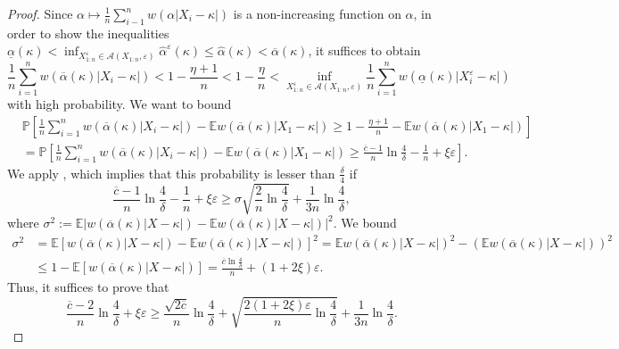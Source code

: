 \documentclass{article}
\theoremstyle{plain}
\theoremstyle{definition}
\def\eps{\varepsilon}
\renewcommand{\Pr}{\mathbb{P}}
\def\sA{\mathcal{A}}
\begin{document}
\begin{appendix}
{\begin{proof}
    Since $\alpha \mapsto \frac{1}{n} \sum_{i-1}^n w(\alpha |X_i - \kappa|)$ is a non-increasing function on $\alpha$, in order to show the inequalities $\underline{\alpha }(\kappa )<\inf_{X_{1:n}^\varepsilon \in \sA(X_{1:n},\varepsilon ) }\widehat{\alpha }^\eps(\kappa ) \le  \widehat{\alpha}(\kappa)< \overline{\alpha}(\kappa ) $, it suffices to obtain
    \[\frac{1}{n}\sum_{i=1}^{n} w(\overline{\alpha}(\kappa)\lvert X_i - \kappa \rvert) < 1-\frac{\eta+1}{n}<1-\frac{\eta}{n}<\inf_{X_{1:n}^\varepsilon \in \sA(X_{1:n},\varepsilon ) } \frac{1}{n}\sum_{i=1}^{n} w(\underline{\alpha}(\kappa)\lvert X_i^\eps - \kappa \rvert)
		\]
		with high probability. We want to bound
		\begin{align*}
			 & \Pr\left[ \frac{1}{n}\sum_{i=1}^{n} w(\overline{\alpha}(\kappa)\lvert X_i - \kappa \rvert) -\mathbb{E}w(\overline{\alpha}(\kappa)\lvert X_1-\kappa \rvert) \ge 1-\frac{\eta+1}{n}-\mathbb{E}w(\overline{\alpha}(\kappa)\lvert X_1-\kappa \rvert)\right] \\
       & =\Pr\left[\frac{1}{n}\sum_{i=1}^{n} w(\overline{\alpha}(\kappa)\lvert X_i - \kappa \rvert) -\mathbb{E}w(\overline{\alpha}(\kappa)\lvert X_1-\kappa \rvert) \ge \frac{\overline{c}-1 }{n}\ln \frac{4}{\delta}-\frac{1}{n}+\xi \eps \right].
		\end{align*}
    We apply , which implies that this probability is lesser than \( \frac{\delta}{4} \) if \[
			\frac{\overline{c}-1 }{n}\ln \frac{4}{\delta}-\frac{1}{n}+\xi \eps \ge \sigma\sqrt{\frac{2}{n}\ln \frac{4}{\delta}}+\frac{1}{3n}\ln \frac{4}{\delta},
		\]
		where \( \sigma^2:=\mathbb{E} \lvert w(\overline{\alpha}(\kappa)\lvert X -\kappa \rvert)- \mathbb{E}w(\overline{\alpha}(\kappa)\lvert X-\kappa \rvert)\rvert^2\). We bound
		\begin{align*}
			\sigma^2 & =\mathbb{E}\left[w(\overline{\alpha}(\kappa)\lvert X-\kappa \rvert)- \mathbb{E}w(\overline{\alpha}(\kappa)\lvert X-\kappa \rvert)\right]^2 = \mathbb{E}w(\overline{\alpha}(\kappa)\lvert X-\kappa \rvert)^2- (\mathbb{E}w(\overline{\alpha}(\kappa)\lvert X-\kappa \rvert))^2\\
               & \le 1-\mathbb{E}\left[w(\overline{\alpha }(\kappa ) \lvert X-\kappa  \rvert )\right] = \frac{\overline{c} \ln \frac{4}{\delta }}{n} + (1+2\xi )\varepsilon.  
		\end{align*}
    Thus, it suffices to prove that \[
    \frac{\overline{c}-2}{n}\ln \frac{4}{\delta }+\xi \eps \ge \frac{\sqrt{2\overline{c}}}{n}\ln \frac{4}{\delta }+\sqrt{ \frac{2(1+2\xi )\eps}{n} \ln \frac{4}{\delta }} +\frac{1}{3n}\ln \frac{4}{\delta }. 
\]
\end{proof}}
\end{appendix}
\end{document}
